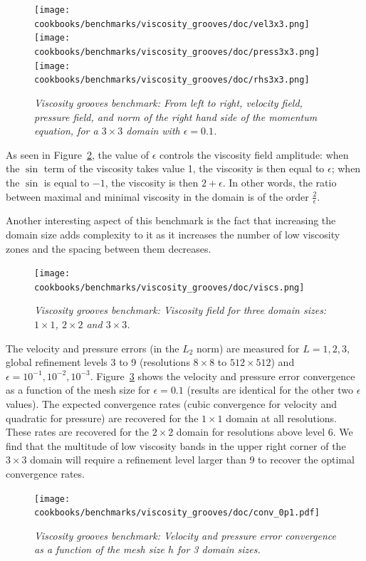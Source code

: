 \documentclass{article}
\begin{document}
\begin{figure}
\centering
\texttt{[image: cookbooks/benchmarks/viscosity\_grooves/doc/vel3x3.png]}
\texttt{[image: cookbooks/benchmarks/viscosity\_grooves/doc/press3x3.png]}
\texttt{[image: cookbooks/benchmarks/viscosity\_grooves/doc/rhs3x3.png]}
\hfill
\caption{\it Viscosity grooves benchmark: From left to right, velocity field, pressure field, and
norm of the right hand side of the momentum equation, for a $3\times 3$ domain
with $\epsilon=0.1$.}
\label{fig:benchmark-grooves-3x3}
\end{figure}

As seen in Figure~\ref{fig:benchmark-grooves-domains}, the value of $\epsilon$ controls the viscosity field amplitude:
when the $\sin$ term of the viscosity takes value 1, the viscosity is then equal to $\epsilon$; when the $\sin$ is
equal to $-1$, the viscosity is then $2+\epsilon$. In other words, the ratio between maximal and minimal
viscosity in the domain is of the order $\frac{2}{\epsilon}$.

Another interesting aspect of this benchmark is the fact that increasing the domain size
adds complexity to it as it increases the number of low viscosity zones and the spacing
between them decreases.

\begin{figure}
\centering
\texttt{[image: cookbooks/benchmarks/viscosity\_grooves/doc/viscs.png]}
\caption{\it Viscosity grooves benchmark: Viscosity field for three domain sizes: $1\times 1$, $2\times 2$ and $3\times 3$.}
\label{fig:benchmark-grooves-domains}
\end{figure}

The velocity and pressure errors (in the $L_2$ norm) are measured for $L=1,2,3$, global refinement
levels 3 to 9 (resolutions $8\times 8$ to $512\times 512$)
and $\epsilon=10^{-1},10^{-2},10^{-3}$. Figure~\ref{fig:benchmark-grooves-errors} shows the velocity and pressure error convergence as a function of the mesh size for $\epsilon=0.1$ (results are identical for the other two $\epsilon$ values).
The expected convergence rates (cubic convergence for velocity and quadratic for pressure) are recovered for the $1\times 1$ domain at all resolutions. These rates are recovered for the $2\times 2$ domain for resolutions above level 6. We find that
the multitude of low viscosity bands in the upper right corner of the $3\times 3$ domain will require a refinement level larger than 9 to recover the optimal convergence rates.

\begin{figure}
\centering
\texttt{[image: cookbooks/benchmarks/viscosity\_grooves/doc/conv\_0p1.pdf]}
\caption{\it Viscosity grooves benchmark: Velocity and pressure error convergence as a function of the mesh size $h$ for 3 domain sizes.}
\label{fig:benchmark-grooves-errors}
\end{figure}
\end{document}
